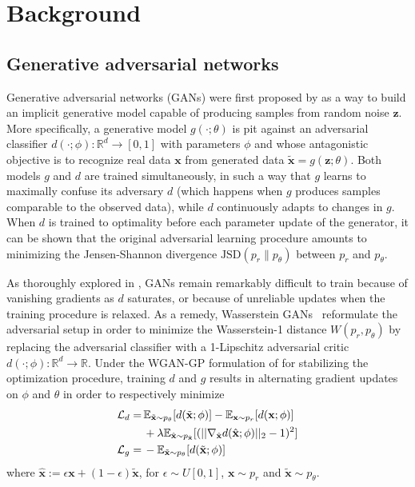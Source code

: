 \documentclass[twocolumn,superscriptaddress,aps]{revtex4-1}
\theoremstyle{plain}
\begin{document}

\section{Background}

\subsection{Generative adversarial networks}

Generative adversarial networks (GANs) were first proposed by
\cite{goodfellow2014generative} as a way to build an implicit generative model
capable of producing samples from random noise $\mathbf{z}$. More specifically,
a generative model $g(\cdot; \theta)$ is pit against an adversarial
classifier $d(\cdot; \phi):\mathbb{R}^d \to [0,1]$ with parameters $\phi$ and whose antagonistic objective is to recognize real data $\mathbf{x}$
from generated data $\tilde{\mathbf{x}} = g(\mathbf{z}; \theta)$. Both models $g$ and $d$
are trained simultaneously, in such a way that $g$ learns to maximally confuse
its adversary $d$ (which happens when $g$ produces samples comparable to the
observed data), while $d$ continuously adapts to changes in $g$. When $d$ is
trained to optimality before each parameter update of the generator, it can
be shown that the original adversarial learning procedure amounts to minimizing
the Jensen-Shannon divergence $\text{JSD}(p_r \parallel p_\theta)$ between $p_r$ and $p_\theta$.

As thoroughly explored in \citep{2017arXiv170104862A}, GANs remain remarkably
difficult to train because of vanishing gradients as $d$ saturates, or because of
unreliable updates when the training procedure is relaxed. As a remedy,
Wasserstein GANs~\citep{2017arXiv170107875A} reformulate the adversarial
setup in order to minimize the Wasserstein-1 distance $W(p_r, p_\theta)$ by
replacing the adversarial classifier with a 1-Lipschitz adversarial critic
$d(\cdot; \phi) : \mathbb{R}^d \to \mathbb{R}$. Under the WGAN-GP formulation of \cite{2017arXiv170400028G}
for stabilizing the optimization procedure,
training $d$ and $g$ results in alternating gradient updates on $\phi$ and $\theta$ in order to respectively minimize
\begin{align}
    {\cal L}_d =\,& \mathbb{E}_{\tilde{\mathbf{x}} \sim p_\theta} [d(\tilde{\mathbf{x}};\phi)] - \mathbb{E}_{\mathbf{x} \sim p_r} [d(\mathbf{x};\phi)]  \nonumber \\
                  & + \lambda \mathbb{E}_{\hat{\mathbf{x}} \sim p_{\hat{\mathbf{x}}}} [(|| \nabla_{\hat{\mathbf{x}}} d({\hat{\mathbf{x}}};\phi) ||_2 - 1)^2] \\
    {\cal L}_g =\,& -\mathbb{E}_{\tilde{\mathbf{x}} \sim p_\theta} [d(\tilde{\mathbf{x}};\phi)]
\end{align}
where ${\hat{\mathbf{x}}} := \epsilon \mathbf{x} + (1-\epsilon)\tilde{\mathbf{x}}$, for $\epsilon \sim U[0,1]$, $\mathbf{x} \sim p_r$ and $\tilde{\mathbf{x}} \sim p_\theta$.
\end{document}
